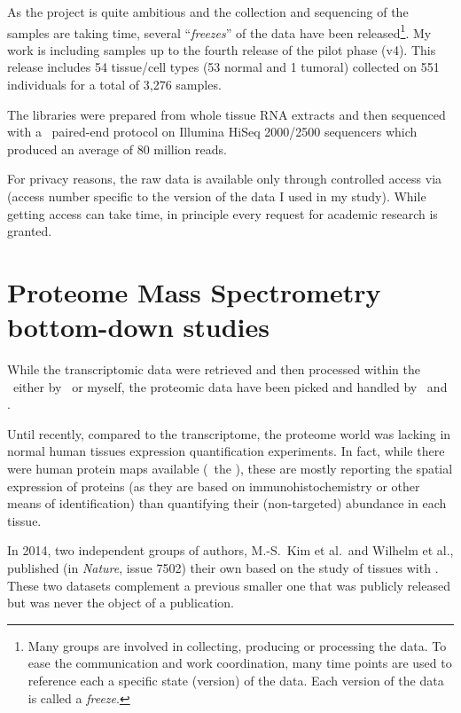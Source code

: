 As the project is quite ambitious and the collection and sequencing of the samples
are taking time, several \enquote{\emph{freezes}} of the data have been
released\footnote{Many groups are involved in collecting, producing or processing
the data. To ease the communication and work coordination,
many time points are used to reference each a specific state (version)
of the data. Each version of the data is called a \emph{freeze}.}.
My work is
including samples up to the fourth release of the pilot phase (v4). This
release includes 54 tissue/cell types (53 normal and 1 tumoral)
collected on 551 individuals for a total of 3,276 samples.

The libraries were prepared from whole tissue \gls{RNA} extracts and then
sequenced with a \mRNA\ paired-end protocol on Illumina HiSeq 2000/2500
sequencers which produced an average of 80 million reads.

For privacy reasons, the raw data is available only through controlled access via
 (access number specific to the version of the data I used
in my study). While getting access can take time, in principle every request for
academic research is granted.

\section[Proteome Mass Spectrometry bottom-down studies]%
{Proteome Mass Spectrometry bottom-down studies \quad}\label{sec:ProteoData}

While the transcriptomic data were retrieved and then processed within the \EBI\
either by \nuno\ or myself, the proteomic data have been picked and
handled by \jyoti\ and \james.

Until recently, compared to the transcriptome, the proteome world
was lacking in normal human tissues expression quantification
experiments. In fact, while there were human protein maps available
(\eg\ the \hFo{Human Protein Atlas}{www.proteinatlas.org}), these
are mostly reporting the spatial expression of proteins (as they are based
on immunohistochemistry or other means of identification) than quantifying
their (non-targeted) abundance in each tissue.

In 2014, two independent groups of authors, M.-S.\ Kim et al.\
and Wilhelm et al., published (in \textit{Nature},
issue 7502) their own 
based on the study of tissues with \ms. These two datasets complement a previous
smaller one that was publicly released but was never the object of a publication.

